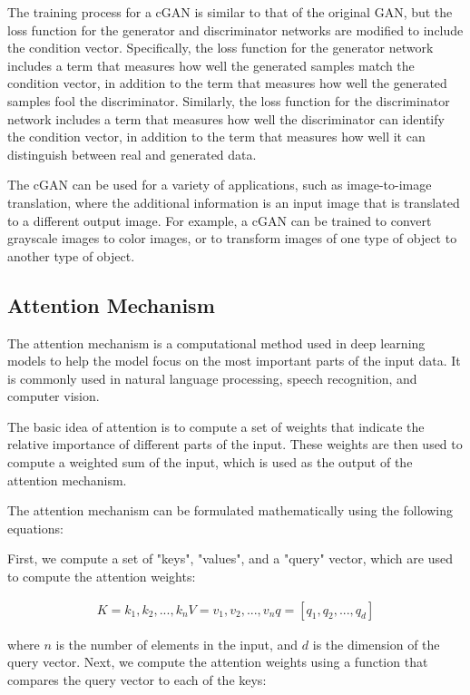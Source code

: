 The training process for a cGAN is similar to that of the original GAN, but the loss function for the generator and discriminator networks are modified to include the condition vector. Specifically, the loss function for the generator network includes a term that measures how well the generated samples match the condition vector, in addition to the term that measures how well the generated samples fool the discriminator. Similarly, the loss function for the discriminator network includes a term that measures how well the discriminator can identify the condition vector, in addition to the term that measures how well it can distinguish between real and generated data.

The cGAN can be used for a variety of applications, such as image-to-image translation, where the additional information is an input image that is translated to a different output image. For example, a cGAN can be trained to convert grayscale images to color images, or to transform images of one type of object to another type of object.

\subsection{Attention Mechanism}
\label{subsec:3_attention}

The attention mechanism is a computational method used in deep learning models to help the model focus on the most important parts of the input data. It is commonly used in natural language processing, speech recognition, and computer vision.

The basic idea of attention is to compute a set of weights that indicate the relative importance of different parts of the input. These weights are then used to compute a weighted sum of the input, which is used as the output of the attention mechanism.

The attention mechanism can be formulated mathematically using the following equations:

First, we compute a set of "keys", "values", and a "query" vector, which are used to compute the attention weights:

\begin{equation}
\begin{split}
	K = {k_1, k_2, ..., k_n}
	V = {v_1, v_2, ..., v_n}
	q = [q_1, q_2, ..., q_d]
\end{split}
\end{equation}

where $n$ is the number of elements in the input, and $d$ is the dimension of the query vector. Next, we compute the attention weights using a function that compares the query vector to each of the keys:

